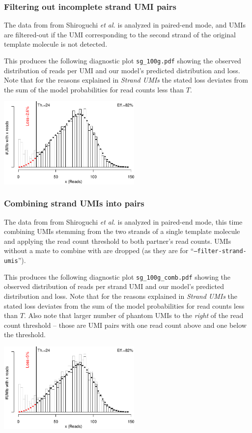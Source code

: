 \documentclass[10pt]{article}
\begin{document}
\subsubsection*{Filtering out incomplete strand UMI pairs}

The data from from Shiroguchi \textit{et al.} is analyzed in paired-end mode, and UMIs are filtered-out if the UMI corresponding to the second strand of the original template molecule is not detected.


This produces the following diagnostic plot \texttt{sg\_100g.pdf} showing the observed distribution of reads per UMI and our model's predicted distribution and loss. Note that for the reasons explained in \emph{Strand UMIs} the stated loss deviates from the sum of the model probabilities for read counts less than $T$.

{\centering \includegraphics[width=7cm]{../examples/sg_100g.pdf}\\}

\subsubsection*{Combining strand UMIs into pairs}

The data from from Shiroguchi \textit{et al.} is analyzed in paired-end mode, this time combining UMIs stemming from the two strands of a single template molecule and applying the read count threshold to both partner's read counts. UMIs without a mate to combine with are dropped (as they are for ``\texttt{--filter-strand-umis}'').


This produces the following diagnostic plot \texttt{sg\_100g\_comb.pdf} showing the observed distribution of reads per strand UMI and our model's predicted distribution and loss. Note that for the reasons explained in \emph{Strand UMIs} the stated loss deviates from the sum of the model probabilities for read counts less than $T$. Also note that larger number of phantom UMIs to the \emph{right} of the read count threshold -- those are UMI pairs with one read count above and one below the threshold.

{\centering \includegraphics[width=7cm]{../examples/sg_100g_comb.pdf}\\}
\end{document}
